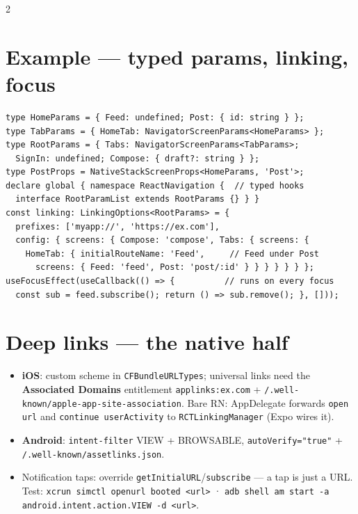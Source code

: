 \documentclass[8pt]{extarticle}
\begin{document}
\begin{multicols}{2}
\section{Example — typed params, linking, focus}
\begin{lstlisting}[language=TSSheet]
type HomeParams = { Feed: undefined; Post: { id: string } };
type TabParams = { HomeTab: NavigatorScreenParams<HomeParams> };
type RootParams = { Tabs: NavigatorScreenParams<TabParams>;
  SignIn: undefined; Compose: { draft?: string } };
type PostProps = NativeStackScreenProps<HomeParams, 'Post'>;
declare global { namespace ReactNavigation {  // typed hooks
  interface RootParamList extends RootParams {} } }
const linking: LinkingOptions<RootParams> = {
  prefixes: ['myapp://', 'https://ex.com'],
  config: { screens: { Compose: 'compose', Tabs: { screens: {
    HomeTab: { initialRouteName: 'Feed',     // Feed under Post
      screens: { Feed: 'feed', Post: 'post/:id' } } } } } } };
useFocusEffect(useCallback(() => {          // runs on every focus
  const sub = feed.subscribe(); return () => sub.remove(); }, []));
\end{lstlisting}

\columnbreak

\section{Deep links — the native half}
\begin{itemize}
  \item \textbf{iOS}: custom scheme in \texttt{CFBundleURLTypes}; universal links need the
        \textbf{Associated Domains} entitlement \texttt{applinks:ex.com} +
        \texttt{/.well-known/apple-app-site-association}. Bare RN: AppDelegate forwards
        \texttt{open url} and \texttt{continue userActivity} to
        \texttt{RCTLinkingManager} (Expo wires it).
  \item \textbf{Android}: \texttt{intent-filter} VIEW + BROWSABLE,
        \texttt{autoVerify="true"} + \texttt{/.well-known/assetlinks.json}.
  \item Notification taps: override \texttt{getInitialURL}/\texttt{subscribe} — a tap is
        just a URL. Test:
        \texttt{xcrun simctl openurl booted <url>} ·
        \texttt{adb shell am start -a android.intent.action.VIEW -d <url>}.
\end{itemize}


\end{multicols}
\end{document}
